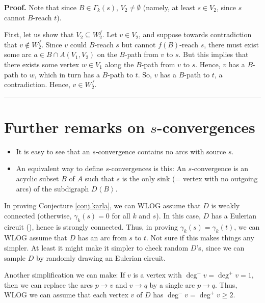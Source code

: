 \documentclass[numbers=enddot,12pt,final,onecolumn,notitlepage]{scrartcl}%
\theoremstyle{definition}
\newenvironment{proof}[1][Proof]{\noindent\textbf{#1.} }{\ \rule{0.5em}{0.5em}}
\newenvironment{noncompile}{}{}
\theoremstyle{plainsl}
\begin{document}
\begin{proof}
    Note that since $B \in \Gamma_{k}(s)$, $V_{2} \neq \emptyset$ (namely, at least $s \in V_{2}$, since $s$ cannot $B$-reach $t$).

    First, let us show that $V_{2} \subseteq W_{2}^f$. Let $v \in V_{2}$, and suppose towards contradiction that $v \notin W_{2}^f$. Since $v$ could $B$-reach $s$ but cannot $f(B)$-reach $s$, there must exist some arc $a \in B \cap A(V_{1},V_{2})$ on the $B$-path from $v$ to $s$. But this implies that there exists some vertex $w \in V_{1}$ along the $B$-path from $v$ to $s$. Hence, $v$ has a $B$-path to $w$, which in turn has a $B$-path to $t$. So, $v$ has a $B$-path to $t$, a contradiction. Hence, $v \in W_{2}^f$. 
\end{proof}

\section{Further remarks on $s$-convergences}

\begin{itemize}
\item It is easy to see that an $s$-convergence contains no arcs with source
$s$.

\item An equivalent way to define $s$-convergences is this: An $s$-convergence
is an acyclic subset $B$ of $A$ such that $s$ is the only sink (= vertex with
no outgoing arcs) of the subdigraph $D\left\langle B\right\rangle $.
\end{itemize}

\begin{noncompile}
In proving Conjecture \ref{conj.karla}, we can WLOG assume that $D$ is weakly
connected (otherwise, $\gamma_{k}\left(  s\right)  =0$ for all $k$ and $s$).
In this case, $D$ has a Eulerian circuit (\cite[Theorem 4.7.2]{22s}), hence is
strongly connected. Thus, in proving $\gamma_{k}\left(  s\right)  =\gamma
_{k}\left(  t\right)  $, we can WLOG assume that $D$ has an arc from $s$ to
$t$. Not sure if this makes things any simpler. At least it might make it
simpler to check random $D$'s, since we can sample $D$ by randomly drawing an
Eulerian circuit.

Another simplification we can make: If $v$ is a vertex with $\deg^{-}%
v=\deg^{+}v=1$, then we can replace the arcs $p\rightarrow v$ and
$v\rightarrow q$ by a single arc $p\rightarrow q$. Thus, WLOG we can assume
that each vertex $v$ of $D$ has $\deg^{-}v=\deg^{+}v\geq2$.
\end{noncompile}
\end{document}
